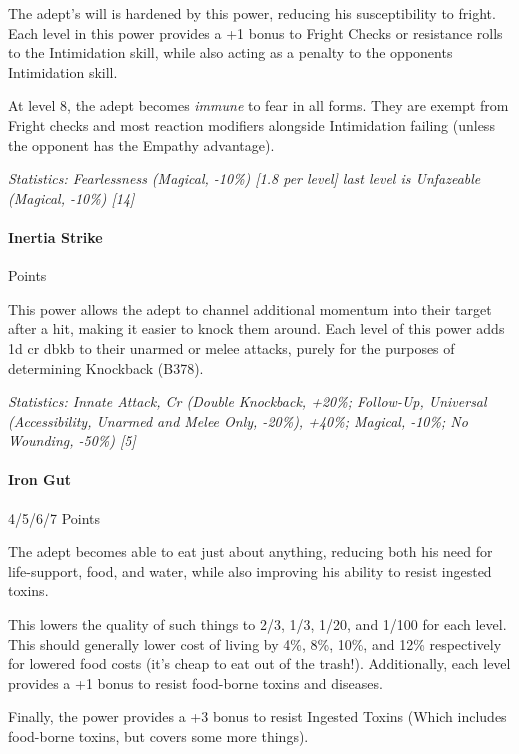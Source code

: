 \begin{multicols}{3}
		The adept's will is hardened by this power, reducing his susceptibility to fright. Each level in this power provides a +1 bonus to Fright Checks or resistance rolls to the Intimidation skill, while also acting as a penalty to the opponents Intimidation skill. 
		
		At level 8, the adept becomes \textit{immune} to fear in all forms. They are exempt from Fright checks and most reaction modifiers alongside Intimidation failing (unless the opponent has the Empathy advantage).

		\textcolor{OliveGreen}{\textit{Statistics: Fearlessness (Magical, -10\%) [1.8 per level] last level is Unfazeable (Magical, -10\%) [14] }}

	\paragraph{Inertia Strike}
	\begin{flushright}
		Points
	\end{flushright}

		This power allows the adept to channel additional momentum into their target after a hit, making it easier to knock them around. Each level of this power adds 1d cr dbkb to their unarmed or melee attacks, purely for the purposes of determining Knockback (B378).

		\textcolor{OliveGreen}{\textit{Statistics: Innate Attack, Cr (Double Knockback, +20\%; Follow-Up, Universal (Accessibility, Unarmed and Melee Only, -20\%), +40\%; Magical, -10\%; No Wounding, -50\%) [5] }}
	
	\paragraph{Iron Gut}
	\begin{flushright}
		4/5/6/7 Points
	\end{flushright}

		The adept becomes able to eat just about anything, reducing both his need for life-support, food, and water, while also improving his ability to resist ingested toxins. 
		
		This lowers the quality of such things to 2/3, 1/3, 1/20, and 1/100 for each level. This should generally lower cost of living by 4\%, 8\%, 10\%, and 12\% respectively for lowered food costs (it's cheap to eat out of the trash!). Additionally, each level provides a +1 bonus to resist food-borne toxins and diseases.
		
		Finally, the power provides a +3 bonus to resist Ingested Toxins (Which includes food-borne toxins, but covers some more things).


\end{multicols}
